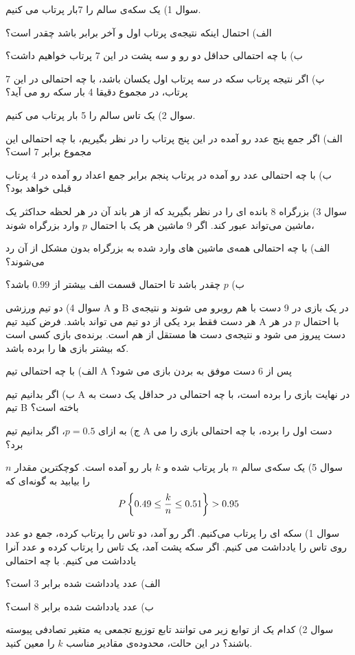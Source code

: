 \documentclass[10pt,letterpaper]{article}
\begin{document}
سوال 1) یک سکه‌ی سالم را 7بار پرتاب می کنیم.

الف) احتمال اینکه نتیجه‌ی پرتاب اول و آخر برابر باشد چقدر است؟

ب) با چه احتمالی حداقل دو رو و سه پشت در این 7 پرتاب خواهیم داشت؟

پ) اگر نتیجه پرتاب سکه در سه پرتاب اول یکسان باشد، با چه احتمالی در این 7 پرتاب، در مجموع دقیقا 4 بار سکه رو می آید؟

سوال 2) یک تاس سالم را 5 بار پرتاب می کنیم.

الف) اگر جمع پنج عدد رو آمده در این پنج پرتاب را در نظر بگیریم، با چه احتمالی این مجموع برابر 7 است؟

ب) با چه احتمالی عدد رو آمده در پرتاب پنجم برابر جمع اعداد رو آمده در 4 پرتاب قبلی خواهد بود؟

سوال 3) بزرگراه 8 بانده ای را در نظر بگیرید که از هر باند آن در هر لحظه حداکثر یک ماشین می‌تواند عبور کند. اگر 9 ماشین هر یک با احتمال $p$ وارد بزرگراه شوند،

الف) با چه احتمالی همه‌ی ماشین های وارد شده به بزرگراه بدون مشکل از آن رد می‌شوند؟

ب) $p$ چقدر باشد تا احتمال قسمت الف بیشتر از $0.99$ باشد؟

سوال 4) دو تیم ورزشی A و B در یک بازی در 9 دست با هم روبرو می شوند و نتیجه‌ی هر دست فقط برد یکی از دو تیم می تواند باشد. فرض کنید تیم A با احتمال $p$ در هر دست پیروز می شود و نتیجه‌ی دست ها مستقل از هم است. برنده‌ی بازی کسی است که بیشتر بازی ها را برده باشد.

الف) با چه احتمالی تیم A پس از 6 دست موفق به بردن بازی می شود؟

ب) اگر بدانیم تیم A در نهایت بازی را برده است، با چه احتمالی در حداقل یک دست به تیم B باخته است؟

ج) به ازای $p=0.5$، اگر بدانیم تیم A دست اول را برده، با چه احتمالی بازی را می برد؟

سوال 5) یک سکه‌ی سالم $n$ بار پرتاب شده و $k$ بار رو آمده است. کوچکترین مقدار $n$ را بیابید به گونه‌ای که
$$
P\left\{0.49\le{k\over n}\le0.51\right\}>0.95
$$

سوال 1) سکه ای را پرتاب می‌کنیم. اگر رو آمد، دو تاس را پرتاب کرده، جمع دو عدد روی تاس را یادداشت می کنیم. اگر سکه پشت آمد، یک تاس را پرتاب کرده و عدد آنرا یادداشت می کنیم. با چه احتمالی

الف)
 عدد یادداشت شده برابر 3 است؟

ب)
 عدد یادداشت شده برابر 8 است؟

سوال 2) کدام یک از توابع زیر می توانند تابع توزیع تجمعی یه متغیر تصادفی پیوسته باشند؟ در این حالت، محدوده‌ی مقادیر مناسب $k$ را معین کنید.
\end{document}
